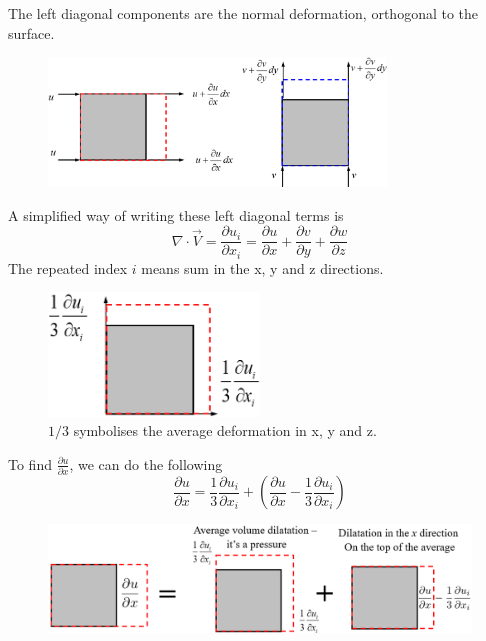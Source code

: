 \documentclass[class=report, crop=false, 12pt,a4paper]{standalone}
\begin{document}
The left diagonal components are the normal deformation, orthogonal to the surface.
\begin{figure}[H]
  \centering
  \includegraphics[width = 0.8\textwidth]{../img/diagram2.png}
\end{figure}
A simplified way of writing these left diagonal terms is
\begin{equation}
  \nabla \cdot \vec{V} = \frac{\partial u_i}{\partial x_i} = \frac{\partial u}{\partial x} + \frac{\partial v}{\partial y} + \frac{\partial w}{\partial z} 
\end{equation}
The repeated index $i$ means sum in the x, y and z directions.
\begin{figure}[H]
  \centering
  \includegraphics[width = 0.5\textwidth]{../img/diagram3.png}
  \caption{$1/3$ symbolises the average deformation in x, y and z.}
\end{figure}
To find $\frac{\partial u}{\partial x}$, we can do the following
\begin{equation}
  \frac{\partial u}{\partial x} = \frac{1}{3}\frac{\partial u_i}{\partial x_i} + \left( \frac{\partial u}{\partial x} - \frac{1}{3}\frac{\partial u_i}{\partial x_i} \right)
\end{equation}
\begin{figure}[H]
  \centering
  \includegraphics[width = \textwidth]{../img/diagram4.png}
\end{figure}
\end{document}
